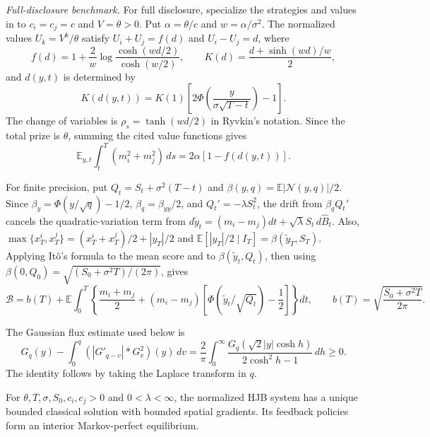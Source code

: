 \documentclass[mnsc]{informs3}
\begin{document}
\begin{APPENDICES}
{\emph{Full-disclosure benchmark.}
For full disclosure, specialize the strategies and values in
\citet[Propositions~1 and 3, equations~(18) and (23)]{Ryvkin2022Fight}
to $c_i=c_j=c$ and $V=\theta>0$.
Put $\alpha=\theta/c$ and $w=\alpha/\sigma^2$. The normalized values
$U_k=V^k/\theta$ satisfy
$U_i+U_j=f(d)$ and $U_i-U_j=d$, where
\begin{equation}\label{eq-design-full-values}
f(d)=1+\frac2w\log\frac{\cosh(wd/2)}{\cosh(w/2)},\qquad
K(d)=\frac{d+\sinh(wd)/w}{2},
\end{equation}
and $d(y,t)$ is determined by
\begin{equation}\label{eq-design-full-gap}
K(d(y,t))=K(1)
\left[2\Phi\!\left(\frac{y}{\sigma\sqrt{T-t}}\right)-1\right].
\end{equation}
The change of variables is $\rho_s=\tanh(wd/2)$ in Ryvkin's notation.
Since the total prize is $\theta$, summing the cited value functions gives
\begin{equation}\label{eq-design-full-energy}
\mathbb E_{y,t}\int_t^T(m_i^2+m_j^2)\,ds
=2\alpha[1-f(d(y,t))].
\end{equation}

For finite precision, put $Q_t=S_t+\sigma^2(T-t)$ and
$\beta(y,q)=\mathbb E|\mathcal N(y,q)|/2$.
Since $\beta_y=\Phi(y/\sqrt q)-1/2$, $\beta_q=\beta_{yy}/2$,
and $Q_t'=-\lambda S_t^2$, the drift from $\beta_qQ_t'$ cancels the
quadratic-variation term from
$d\tilde y_t=(m_i-m_j)dt+\sqrt\lambda S_t\,d\widehat B_t$.
Also,
$\max\{x_T^i,x_T^j\}=(x_T^i+x_T^j)/2+|y_T|/2$ and
$\mathbb E[|y_T|/2\mid I_T]=\beta(\tilde y_T,S_T)$. Applying It\^o's
formula to the mean score and to $\beta(\tilde y_t,Q_t)$, then using
$\beta(0,Q_0)=\sqrt{(S_0+\sigma^2T)/(2\pi)}$, gives
\begin{equation}\label{eq-best-output-drift-identity}
\mathcal B=b(T)+\mathbb E\int_0^T
\left\{\frac{m_i+m_j}{2}
+(m_i-m_j)\left[\Phi(\tilde y_t/\sqrt{Q_t})-\frac12\right]\right\}dt,
\qquad b(T)=\sqrt{\frac{S_0+\sigma^2T}{2\pi}}.
\end{equation}

The Gaussian flux estimate used below is
\begin{equation}\label{eq-design-gaussian-bilinear}
G_q(y)-\int_0^q(|G'_{q-v}|*G_v^2)(y)\,dv
=\frac2\pi\int_0^\infty
\frac{G_q(\sqrt2|y|\cosh h)}{2\cosh^2h-1}\,dh\geq0.
\end{equation}
The identity follows by taking the Laplace transform in $q$.

\begin{lemma}\label{lem-design-positive-equilibrium}
For $\theta,T,\sigma,S_0,c_i,c_j>0$ and $0<\lambda<\infty$, the normalized
HJB system has a unique bounded classical solution with bounded spatial
gradients. Its feedback policies form an interior Markov-perfect equilibrium.
\end{lemma}

}
\end{APPENDICES}
\end{document}
